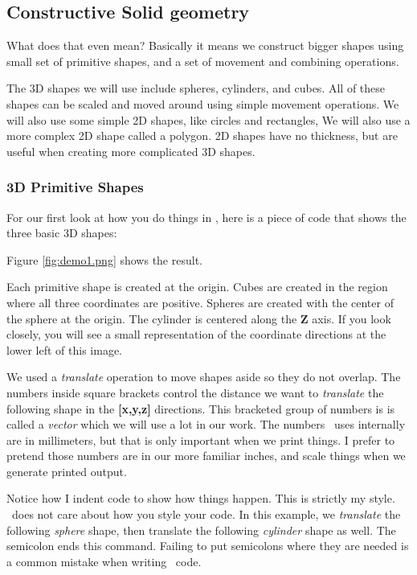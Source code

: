 \subsection{Constructive Solid geometry}

What does that even mean?  Basically it means we construct bigger shapes using
small set of primitive shapes, and a set of movement and combining operations.

The 3D shapes we will use include spheres, cylinders, and cubes. All of these
shapes can be scaled and moved around using simple movement operations.  We
will also use some simple 2D shapes, like circles and rectangles, We will also
use a more complex 2D shape called a polygon.  2D shapes have no thickness, but
are useful when creating more complicated 3D shapes.

\subsubsection{3D Primitive Shapes}

For our first look at how you do things in \osc, here is a piece of code
that shows the three basic 3D shapes:


Figure \ref{fig:demo1.png} shows the result.


Each primitive shape is created at the origin. Cubes are created in the region
where all three coordinates are positive. Spheres are created with the center
of the sphere at the origin. The cylinder is centered along the {\bf Z} axis.
If you look closely, you will see a small representation of the coordinate
directions at the lower left of this image.

We used a {\it translate} operation to move shapes aside so they do not
overlap. The numbers inside square brackets control the distance we want to
{\it translate} the following shape in the {\bf [x,y,z]} directions. This
bracketed group of numbers is is called a {\it vector} which we will use a lot
in our work. The numbers \osc\ uses internally are in millimeters, but that is
only important when we print things. I prefer to pretend those numbers are in our
more familiar inches, and scale things when we generate printed output.

Notice how I indent code to show how things happen. This is strictly my style.
\osc\ does not care about how you style your code. In this example, we {\it
translate} the following {\it sphere} shape, then translate the following {\it
cylinder} shape as well. The semicolon ends this command.
Failing to put semicolons where they are needed is a common mistake when
writing \osc\ code.

